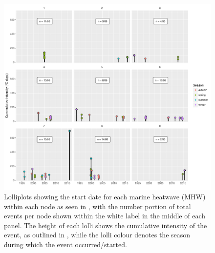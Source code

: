 \documentclass[a4paper,10pt,review]{elsarticle}
\begin{document}
\begin{figure}
\includegraphics[width=1.0\textwidth]{figure_5.pdf}
\caption{Lolliplots showing the start date for each marine heatwave (MHW) within each node as seen in , with the number portion of total events per node shown within the white label in the middle of each panel. The height of each lolli shows the cumulative intensity of the event, as outlined in , while the lolli colour denotes the season during which the event occurred/started.}
\label{figure5}
\end{figure}
\end{document}
